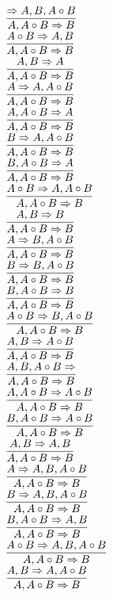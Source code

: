 \documentclass[11pt]{article}
\begin{document}
\begin{center}
\bigskip
\\$\infer{A, A\circ B\Rightarrow B}{\Rightarrow A, B, A\circ B}$
\bigskip
\\$\infer{A, A\circ B\Rightarrow B}{A\circ B\Rightarrow A, B}$
\bigskip
\\$\infer{A, A\circ B\Rightarrow B}{A, B\Rightarrow A}$
\bigskip
\\$\infer{A, A\circ B\Rightarrow B}{A\Rightarrow A, A\circ B}$
\bigskip
\\$\infer{A, A\circ B\Rightarrow B}{A, A\circ B\Rightarrow A}$
\bigskip
\\$\infer{A, A\circ B\Rightarrow B}{B\Rightarrow A, A\circ B}$
\bigskip
\\$\infer{A, A\circ B\Rightarrow B}{B, A\circ B\Rightarrow A}$
\bigskip
\\$\infer{A, A\circ B\Rightarrow B}{A\circ B\Rightarrow A, A\circ B}$
\bigskip
\\$\infer{A, A\circ B\Rightarrow B}{A, B\Rightarrow B}$
\bigskip
\\$\infer{A, A\circ B\Rightarrow B}{A\Rightarrow B, A\circ B}$
\bigskip
\\$\infer{A, A\circ B\Rightarrow B}{B\Rightarrow B, A\circ B}$
\bigskip
\\$\infer{A, A\circ B\Rightarrow B}{B, A\circ B\Rightarrow B}$
\bigskip
\\$\infer{A, A\circ B\Rightarrow B}{A\circ B\Rightarrow B, A\circ B}$
\bigskip
\\$\infer{A, A\circ B\Rightarrow B}{A, B\Rightarrow A\circ B}$
\bigskip
\\$\infer{A, A\circ B\Rightarrow B}{A, B, A\circ B\Rightarrow }$
\bigskip
\\$\infer{A, A\circ B\Rightarrow B}{A, A\circ B\Rightarrow A\circ B}$
\bigskip
\\$\infer{A, A\circ B\Rightarrow B}{B, A\circ B\Rightarrow A\circ B}$
\bigskip
\\$\infer{A, A\circ B\Rightarrow B}{A, B\Rightarrow A, B}$
\bigskip
\\$\infer{A, A\circ B\Rightarrow B}{A\Rightarrow A, B, A\circ B}$
\bigskip
\\$\infer{A, A\circ B\Rightarrow B}{B\Rightarrow A, B, A\circ B}$
\bigskip
\\$\infer{A, A\circ B\Rightarrow B}{B, A\circ B\Rightarrow A, B}$
\bigskip
\\$\infer{A, A\circ B\Rightarrow B}{A\circ B\Rightarrow A, B, A\circ B}$
\bigskip
\\$\infer{A, A\circ B\Rightarrow B}{A, B\Rightarrow A, A\circ B}$

\end{center}
\end{document}

